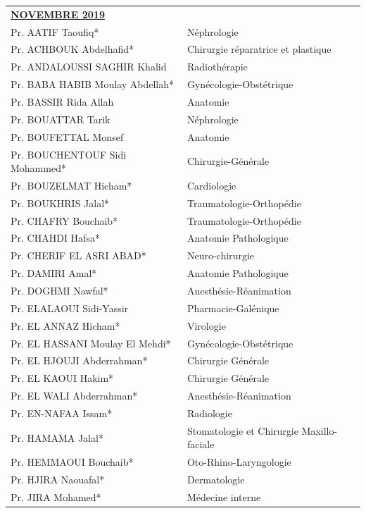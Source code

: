 \begin{table}[H]
  \begin{tabular}{l l}
    \multicolumn{2}{l}{\textbf{\underline{NOVEMBRE 2019}}}\vspace*{0.5em}\\
    Pr. AATIF Taoufiq* & Néphrologie \\
    Pr. ACHBOUK Abdelhafid* & Chirurgie réparatrice et plastique \\
    Pr. ANDALOUSSI SAGHIR Khalid & Radiothérapie \\
    Pr. BABA HABIB Moulay Abdellah* & Gynécologie-Obstétrique \\
    Pr. BASSIR Rida Allah & Anatomie \\
    Pr. BOUATTAR Tarik & Néphrologie \\
    Pr. BOUFETTAL Monsef & Anatomie \\
    Pr. BOUCHENTOUF Sidi Mohammed* & Chirurgie-Générale \\
    Pr. BOUZELMAT Hicham* & Cardiologie \\
    Pr. BOUKHRIS Jalal* & Traumatologie-Orthopédie \\
    Pr. CHAFRY Bouchaib* & Traumatologie-Orthopédie \\
    Pr. CHAHDI Hafsa* & Anatomie Pathologique \\
    Pr. CHERIF EL ASRI ABAD* & Neuro-chirurgie \\
    Pr. DAMIRI Amal* & Anatomie Pathologique \\
    Pr. DOGHMI Nawfal* & Anesthésie-Réanimation \\
    Pr. ELALAOUI Sidi-Yassir & Pharmacie-Galénique \\
    Pr. EL ANNAZ Hicham* & Virologie \\
    Pr. EL HASSANI Moulay El Mehdi* & Gynécologie-Obstétrique \\
    Pr. EL HJOUJI Abderrahman* & Chirurgie Générale \\
    Pr. EL KAOUI Hakim* & Chirurgie Générale \\
    Pr. EL WALI Abderrahman* & Anesthésie-Réanimation \\
    Pr. EN-NAFAA Issam* & Radiologie \\
    Pr. HAMAMA Jalal* & Stomatologie et Chirurgie Maxillo-faciale \\
    Pr. HEMMAOUI Bouchaib* & Oto-Rhino-Laryngologie \\
    Pr. HJIRA Naouafal* & Dermatologie \\
    Pr. JIRA Mohamed* & Médecine interne \\

\end{tabular}
\end{table}
